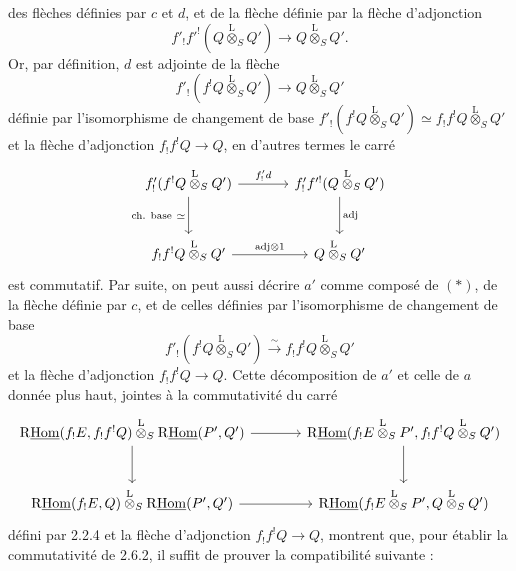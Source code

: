des flèches définies par $c$ et $d$, et de la flèche définie par la flèche d'adjonction
\[
f'_!f'^!(Q\overset{\mathrm{L}}{\otimes}_SQ')\longrightarrow Q\overset{\mathrm{L}}{\otimes}_SQ'.
\]
Or, par définition, $d$ est adjointe de la flèche
\[
f'_!(f^!Q\overset{\mathrm{L}}{\otimes}_SQ')\longrightarrow Q\overset{\mathrm{L}}{\otimes}_SQ'
\]
définie par l'isomorphisme de changement de base $f'_!(f^!Q\overset{\mathrm{L}}{\otimes}_SQ')\simeq f_!f^!Q\overset{\mathrm{L}}{\otimes}_SQ'$ et la flèche d'adjonction $f_!f^!Q\to Q$, en d'autres termes le carré
\[
\begin{tikzcd}[column sep=large,row sep=large]
f'_!(f^!Q\overset{\mathrm{L}}{\otimes}_SQ') \arrow[r,"{f'_!d}"] \arrow[d,"{\text{ch. base}\ \simeq}"'] & f'_!f'^!(Q\overset{\mathrm{L}}{\otimes}_SQ') \arrow[d,"\mathrm{adj}"]\\
f_!f^!Q\overset{\mathrm{L}}{\otimes}_SQ' \arrow[r,"{\mathrm{adj}\otimes 1}"] & Q\overset{\mathrm{L}}{\otimes}_SQ'
\end{tikzcd}
\]
est commutatif. Par suite, on peut aussi décrire $a'$ comme composé de $(*)$, de la flèche définie par $c$, et de celles définies par l'isomorphisme de changement de base
\[
f'_!(f^!Q\overset{\mathrm{L}}{\otimes}_SQ')\xrightarrow{\sim}f_!f^!Q\overset{\mathrm{L}}{\otimes}_SQ'
\]
et la flèche d'adjonction $f_!f^!Q\to Q$. Cette décomposition de $a'$ et celle de $a$ donnée plus haut, jointes à la commutativité du carré
\[
\begin{tikzcd}[column sep=
large,row sep=large]
\mathrm{R}\underline{\mathrm{Hom}}(f_!E,f_!f^!Q)\overset{\mathrm{L}}{\otimes}_S\mathrm{R}\underline{\mathrm{Hom}}(P',Q') \arrow[r] \arrow[d] & \mathrm{R}\underline{\mathrm{Hom}}(f_!E\overset{\mathrm{L}}{\otimes}_SP',f_!f^!Q\overset{\mathrm{L}}{\otimes}_SQ') \arrow[d]\\
\mathrm{R}\underline{\mathrm{Hom}}(f_!E,Q)\overset{\mathrm{L}}{\otimes}_S\mathrm{R}\underline{\mathrm{Hom}}(P',Q') \arrow[r] & \mathrm{R}\underline{\mathrm{Hom}}(f_!E\overset{\mathrm{L}}{\otimes}_SP',Q\overset{\mathrm{L}}{\otimes}_SQ')
\end{tikzcd}
\]
défini par 2.2.4 et la flèche d'adjonction $f_!f^!Q\to Q$, montrent que, pour établir la commutativité de 2.6.2, il suffit de prouver la compatibilité suivante :


